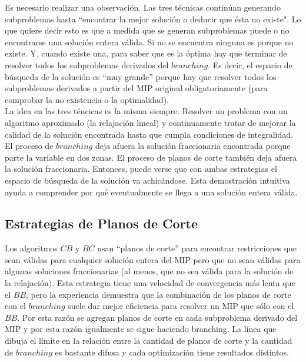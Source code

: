 Es necesario realizar una observación. Las tres técnicas continúan generando subproblemas hasta ``encontrar la mejor solución o deducir que ésta no existe". Lo que quiere decir esto es que a medida que se generan subproblemas puede o no encontrarse una solución entera válida. Si no se encuentra ninguna es porque no existe. Y, cuando existe una, para saber que es la óptima hay que terminar de resolver todos los subproblemas derivados del $branching$. Es decir, el espacio de búsqueda de la solución es ``muy grande'' porque hay que resolver todos los subproblemas derivados a partir del MIP original obligatoriamente (para comprobar la no existencia o la optimalidad).\\

La idea en las tres téncicas es la misma siempre. Resolver un problema con un algoritmo aproximado (la relajación lineal) y continuamente tratar de mejorar la calidad de la solución encontrada hasta que cumpla condiciones de integralidad. El proceso de $branching$ deja afuera la solución fraccionaria encontrada porque parte la variable en dos zonas. El proceso de planos de corte también deja afuera la solución fraccionaria. Entonces, puede verse que con ambas estrategias el espacio de búsqueda de la solución va achicándose. Esta demostración intuitiva ayuda a comprender por qué eventualmente se llega a una solución entera válida.

\newpage

\subsection{Estrategias de Planos de Corte}

Los algoritmos $CB$ y $BC$ usan ``planos de corte'' para encontrar restricciones que sean válidas para cualquier solución entera del MIP pero que no sean válidas para algunas soluciones fraccionarias (al menos, que no sea válida para la solución de la relajación). Esta estrategia tiene una velocidad de convergencia más lenta que el $BB$, pero la experiencia demuestra que la combinación de los planos de corte con el $branching$ suele dar mejor eficiencia para resolver un MIP que sólo con el $BB$. Por esta razón se agregan planos de corte en cada subproblema derivado del MIP y por esta razón igualmente se sigue haciendo branching. La línea que dibuja el límite en la relación entre la cantidad de planos de corte y la cantidad de $branching$ es bastante difusa y cada optimización tiene resultados distintos.\\

